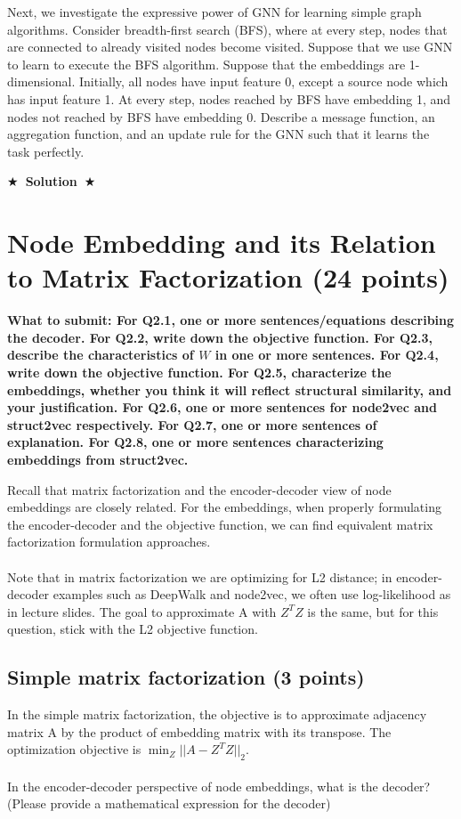 \documentclass{article}
\numberwithin{figure}{section}
\newcommand{\Solution}[1]{%
    {%
        \medskip
        \color{red}
        \bf $\bigstar$~\sf\textbf{Solution}~$\bigstar$ \sf
        #1
    }
    \bigskip
}
\begin{document}
Next, we investigate the expressive power of GNN for learning simple graph algorithms. Consider breadth-first search (BFS), where at every step, nodes that are connected to already visited nodes become visited. Suppose that we use GNN to learn to execute the BFS algorithm. Suppose that the embeddings are 1-dimensional. Initially, all nodes have input feature 0, except a source node which has input feature 1. At every step, nodes reached by BFS have embedding 1, and nodes not reached by BFS have embedding 0. Describe a message function, an aggregation function, and an update rule for the GNN such that it learns the task perfectly.

\Solution{}



\section{Node Embedding and its Relation to Matrix Factorization (24 points)}

\textbf{ What to submit: For Q2.1, one or more sentences/equations describing the decoder. For Q2.2, write down the objective function. For Q2.3, describe the characteristics of $W$ in one or more sentences. For Q2.4, write down the objective function. For Q2.5, characterize the embeddings, whether you think it will reflect structural similarity, and your justification. For Q2.6, one or more sentences for node2vec and struct2vec respectively. For Q2.7, one or more sentences of explanation. For Q2.8, one or more sentences characterizing embeddings from struct2vec.}

Recall that matrix factorization and the encoder-decoder view of node embeddings are closely related. For the embeddings, when properly formulating the encoder-decoder and the objective function, we can find equivalent matrix factorization formulation approaches.\\
\\
    Note that in matrix factorization we are optimizing for L2 distance; in encoder-decoder examples such as DeepWalk and node2vec, we often use log-likelihood as in lecture slides. The goal to approximate A with $Z^TZ$ is the same, but for this question, stick with the L2 objective function.
\subsection{Simple matrix factorization (3 points)}
In the simple matrix factorization, the objective is to approximate adjacency matrix A by the product of embedding matrix with its transpose. The optimization objective is $\min_Z ||A - Z^TZ||_2$.\\
\\
In the encoder-decoder perspective of node embeddings, what is the decoder? (Please provide a mathematical expression for the decoder)
\end{document}
